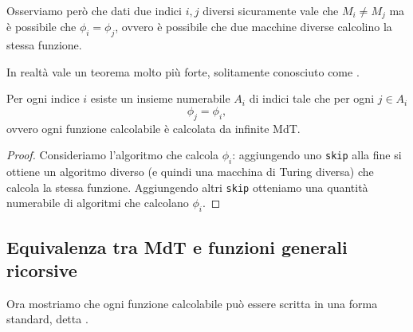 Osserviamo però che dati due indici $i, j$ diversi sicuramente vale che $M_i \neq M_j$ ma è possibile che $\phi_i = \phi_j$, ovvero è possibile che due macchine diverse calcolino la stessa funzione.

In realtà vale un teorema molto più forte, solitamente conosciuto come .

\begin{theorem}
    Per ogni indice $i$ esiste un insieme numerabile $A_i$ di indici tale che per ogni $j \in A_i$ \[
        \phi_j = \phi_i,
    \] ovvero ogni funzione calcolabile è calcolata da infinite MdT.
\end{theorem}
\begin{proof}
    Consideriamo l'algoritmo che calcola $\phi_i$: aggiungendo uno \texttt{skip} alla fine si ottiene un algoritmo diverso (e quindi una macchina di Turing diversa) che calcola la stessa funzione. Aggiungendo altri \texttt{skip} otteniamo una quantità numerabile di algoritmi che calcolano $\phi_i$.  
\end{proof}

\subsection{Equivalenza tra MdT e funzioni generali ricorsive}

Ora mostriamo che ogni funzione calcolabile può essere scritta in una forma standard, detta .

